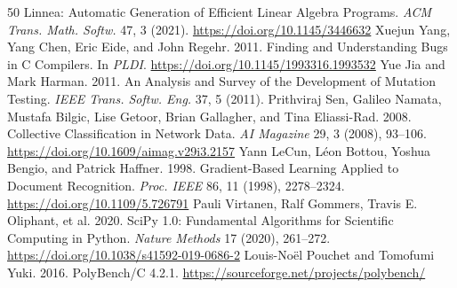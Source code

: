 \documentclass[acmsmall,review,anonymous,nonacm]{acmart}
\begin{document}
\begin{thebibliography}{50}
Linnea: Automatic Generation of Efficient Linear Algebra Programs. \textit{ACM
Trans. Math. Softw.} 47, 3 (2021). \url{https://doi.org/10.1145/3446632}
 Xuejun Yang, Yang Chen, Eric Eide, and John Regehr. 2011. Finding
and Understanding Bugs in C Compilers. In \textit{PLDI}.
\url{https://doi.org/10.1145/1993316.1993532}
 Yue Jia and Mark Harman. 2011. An Analysis and Survey of
the Development of Mutation Testing. \textit{IEEE Trans. Softw. Eng.} 37, 5 (2011).
 Prithviraj Sen, Galileo Namata, Mustafa Bilgic, Lise Getoor, Brian
Gallagher, and Tina Eliassi-Rad. 2008. Collective Classification in Network
Data. \textit{AI Magazine} 29, 3 (2008), 93--106.
\url{https://doi.org/10.1609/aimag.v29i3.2157}
 Yann LeCun, L\'eon Bottou, Yoshua Bengio, and Patrick Haffner.
1998. Gradient-Based Learning Applied to Document Recognition. \textit{Proc.
IEEE} 86, 11 (1998), 2278--2324. \url{https://doi.org/10.1109/5.726791}
 Pauli Virtanen, Ralf Gommers, Travis E. Oliphant, et al. 2020.
SciPy 1.0: Fundamental Algorithms for Scientific Computing in Python.
\textit{Nature Methods} 17 (2020), 261--272.
\url{https://doi.org/10.1038/s41592-019-0686-2}
 Louis-No\"el Pouchet and Tomofumi Yuki. 2016. PolyBench/C
4.2.1. \url{https://sourceforge.net/projects/polybench/}
\end{thebibliography}
\end{document}
